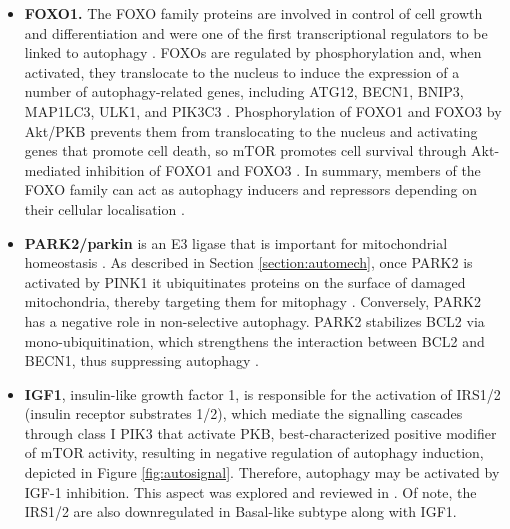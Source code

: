 \begin{itemize}




\item  \textbf{FOXO1.} The FOXO family proteins are involved in control of cell growth and differentiation and were one of the first transcriptional regulators to be linked to autophagy \cite{zhao2007foxo3}. FOXOs are regulated by phosphorylation and, when activated, they translocate to the nucleus to induce the expression of a number of autophagy-related genes, including  ATG12, BECN1, BNIP3, MAP1LC3, ULK1, and PIK3C3 \cite{Feng2015}. Phosphorylation of FOXO1 and FOXO3 by Akt/PKB prevents them from translocating to the nucleus and activating genes that promote cell death, so mTOR promotes cell survival through Akt-mediated inhibition of FOXO1 and FOXO3 \cite{Fullgrabe2016}. In summary, members of the FOXO family can act as autophagy inducers and repressors depending on their cellular localisation \cite{zhao2010cytosolic}.



\item  \textbf{PARK2/parkin} is an E3 ligase that is important for mitochondrial homeostasis \cite{Kroemer2010}.  As described in Section \ref{section:automech}, once PARK2 is activated by PINK1 it ubiquitinates proteins on the surface of damaged mitochondria, thereby targeting them for mitophagy \cite{Feng2015}.  Conversely, PARK2 has a negative role in non-selective autophagy. PARK2 stabilizes BCL2 via mono-ubiquitination, which strengthens the interaction between BCL2 and BECN1, thus suppressing autophagy \cite{chen2010parkin}. 



\item \textbf{IGF1}, insulin-like growth factor 1, is responsible for the activation of IRS1/2 (insulin receptor substrates 1/2), which mediate the signalling cascades through class I PIK3 that activate PKB,  best-characterized positive modifier of mTOR activity, resulting in negative regulation of autophagy induction, depicted in Figure \ref{fig:autosignal}. Therefore, autophagy may be activated by IGF-1 inhibition. This aspect was explored and reviewed in \cite{renna2013igf}.
Of note, the IRS1/2 are also downregulated in Basal-like subtype along with IGF1. 



 
 
 
 
 
 
 
 

\end{itemize}
